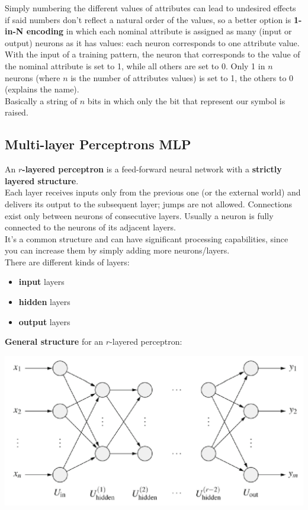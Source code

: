 \documentclass[11pt]{article}
\begin{document}
		Simply numbering the different values of attributes can lead to undesired effects if said numbers don't reflect a natural order of the values, so a better option is \textbf{1-in-N encoding} in which each nominal attribute is assigned as many (input or output) neurons as it has values: each neuron corresponds to one attribute value.\\
		
		With the input of a training pattern, the neuron that corresponds to the value of the nominal attribute is set to 1, while all others are set to 0. Only 1 in $n$ neurons (where $n$ is the number of attributes values) is set to 1, the others to 0 (explains the name).\\
		Basically a string of $n$ bits in which only the bit that represent our symbol is raised.\\
		
		
		\newpage
		
		\subsection{Multi-layer Perceptrons MLP}
		An \textbf{$r$-layered perceptron} is a feed-forward neural network with a \textbf{strictly layered structure}.\\
		
		Each layer receives inputs only from the previous one (or the external world) and delivers its output to the subsequent layer; jumps are not allowed. Connections exist only between neurons of consecutive layers. Usually a neuron is fully connected to the neurons of its adjacent layers.\\
		
		It's a common structure and can have significant processing capabilities, since you can increase them by simply adding more neurons/layers.\\
		
		There are different kinds of layers:
		\begin{itemize}
			\item \textbf{input} layers
			\item \textbf{hidden} layers
			\item \textbf{output} layers
		\end{itemize}
		
		\textbf{General structure} for an $r$-layered perceptron:
		\begin{center}
			\includegraphics[width=0.9\columnwidth]{img/NN/MLP1}
		\end{center}
		
\end{document}
